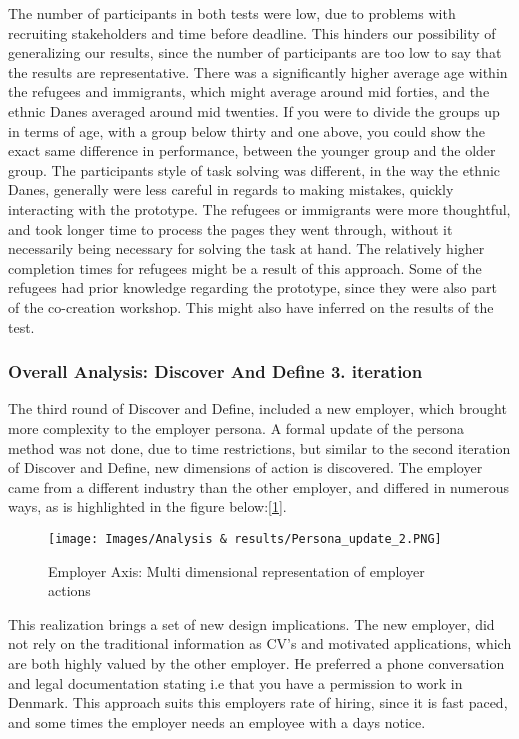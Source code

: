 The number of participants in both tests were low, due to problems with recruiting stakeholders and time before deadline. This hinders our possibility of generalizing our results, since the number of participants are too low to say that the results are representative. There was a significantly higher average age within the refugees and immigrants, which might average around mid forties, and the ethnic Danes averaged around mid twenties. If you were to divide the groups up in terms of age, with a group below thirty and one above, you could show the exact same difference in performance, between the younger group and the older group. The participants style of task solving was different, in the way the ethnic Danes, generally were less careful in regards to making mistakes, quickly interacting with the prototype. The refugees or immigrants were more thoughtful, and took longer time to process the pages they went through, without it necessarily being necessary for solving the task at hand. The relatively higher completion times for refugees might be a result of this approach. Some of the refugees had prior knowledge regarding the prototype, since they were also part of the co-creation workshop. This might also have inferred on the results of the test.

\subsubsection{Overall Analysis: Discover And Define 3. iteration}

The third round of Discover and Define, included a new employer, which brought more complexity to the employer persona. A formal update of the persona method was not done, due to time restrictions, but similar to the second iteration of Discover and Define, new dimensions of action is discovered. The employer came from a different industry than the other employer, and differed in numerous ways, as is highlighted in the figure below:[\ref{persona_update_2}]. 

\begin{figure}[H]
\caption{Employer Axis: Multi dimensional representation of employer actions}
\centering
\label{persona_update_2}
\texttt{[image: Images/Analysis \& results/Persona\_update\_2.PNG]}
\end{figure}

This realization brings a set of new design implications. The new employer, did not rely on the traditional information as CV's and motivated applications, which are both highly valued by the other employer. He preferred a phone conversation and legal documentation stating i.e that you have a permission to work in Denmark. This approach suits this employers rate of hiring, since it is fast paced, and some times the employer needs an employee with a days notice. 

